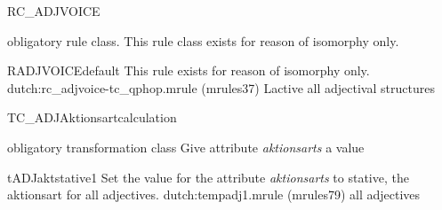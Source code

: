 \newpage
\begin{mruleclass}{RC\_ADJVOICE}
\begin{classdescr}
\kind obligatory rule class.
\classtask This rule class exists for reason of isomorphy only.

\nofilters

\nospeedrules

\noplannedrules

\norulesnotince

\begin{comments}
\end{comments}
\end{classdescr}

\begin{members}

\begin{member}
 RADJVOICEdefault
 This rule exists for reason of isomorphy only.
\file dutch:rc\_adjvoice-tc\_qphop.mrule (mrules37)
\semantics Lactive
\example all adjectival structures
\remarks
\end{member}
\end{members}

\end{mruleclass}
\newpage
\begin{mruleclass}{TC\_ADJAktionsartcalculation }
\begin{classdescr}
\kind obligatory transformation class
\classtask Give attribute {\em aktionsarts} a value

\nofilters

\nospeedrules

\noplannedrules

\norulesnotince

\begin{comments}
\end{comments}
\end{classdescr}

\begin{members}

\begin{member}
 tADJaktstative1
 Set the value for the attribute {\em aktionsarts} to stative, 
the aktionsart for all adjectives.
\file dutch:tempadj1.mrule (mrules79)
\semantics \nosemantics
\example all adjectives
\remarks\mbox{}

\end{member}
\end{members}

\end{mruleclass}

